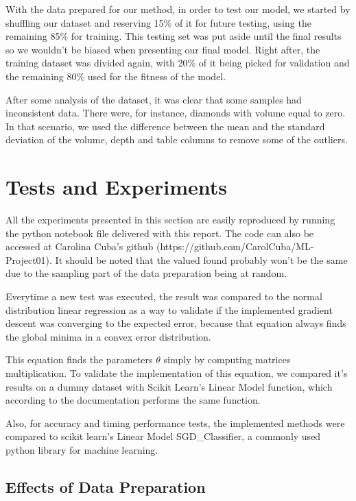 \documentclass[conference]{IEEEtran}
\begin{document}
    With the data prepared for our method, in order to test our model, we started by shuffling our dataset and reserving 15\% of it for future testing, using the remaining 85\% for training. This testing set was put aside until the final results so we wouldn't be biased when presenting our final model. Right after, the training dataset was divided again, with 20\% of it being picked for validation and the remaining 80\% used for the fitness of the model.
    
    After some analysis of the dataset, it was clear that some samples had inconsistent data. There were, for instance, diamonds with volume equal to zero. In that scenario, we used the difference between the mean and the standard deviation of the volume, depth and table columns to remove some of the outliers.
    
\section{Tests and Experiments}

	All the experiments presented in this section are easily reproduced by running the python notebook file delivered with this report. The code can also be accessed at Carolina Cuba's github (https://github.com/CarolCuba/ML-Project01). It should be noted that the valued found probably won't be the same due to the sampling part of the data preparation being at random.
	
	Everytime a new test was executed, the result was compared to the normal distribution linear regression as a way to validate if the implemented gradient descent was converging to the expected error, because that equation always finds the global minima in a convex error distribution. 
	
	This equation finds the parameters $\theta$ simply by computing matrices multiplication. To validate the implementation of this equation, we compared it's results on a dummy dataset with Scikit Learn's Linear Model function, which according to the documentation performs the same function.
	
	Also, for accuracy and timing performance tests, the implemented methods were compared to scikit learn's Linear Model SGD_Classifier, a commonly used python library for machine learning.
	
\subsection{Effects of Data Preparation}
	
\end{document}
